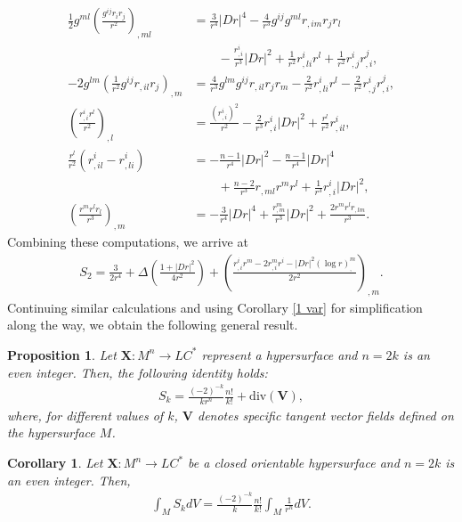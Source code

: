 \documentclass[reqno,11pt, letterpaper]{amsart}
\theoremstyle{plain}
\newtheorem{prop}[thm]{Proposition}
\newtheorem{cor}[thm]{Corollary}
\theoremstyle{definition}
\numberwithin{equation}{section}
\begin{document}
\begin{align*}
	\frac{1}{2} g^{ml} \left( \frac{g^{ij} r_i r_j}{r^2} \right)_{,ml} &= \frac{3}{r^4} |Dr|^4 - \frac{4}{r^3} g^{ij} g^{ml} r_{,im} r_j r_l\\
	&\qquad- \frac{r^i_{,i}}{r^3} |Dr|^2 + \frac{1}{r^2} r^i_{,li} r^l + \frac{1}{r^2} r^i_{,j} r^j_{,i}, \\
	-2 g^{lm} \left( \frac{1}{r^2} g^{ij} r_{,il} r_j \right)_{,m} &= \frac{4}{r^3} g^{lm} g^{ij} r_{,il} r_j r_m - \frac{2}{r^2} r^i_{,li} r^l - \frac{2}{r^2} r^i_{,j} r^j_{,i}, \\
	\left( \frac{r^i_{,i} r^l}{r^2} \right)_{,l} &= \frac{(r^i_{,i})^2}{r^2} - \frac{2}{r^3} r^i_{,i} |Dr|^2 + \frac{r^l}{r^2} r^i_{,il}, \\
	\frac{r^l}{r^2} \left( r^i_{,il} - r^i_{,li} \right) &= -\frac{n-1}{r^4} |Dr|^2 - \frac{n-1}{r^4} |Dr|^4\\
	&\qquad+ \frac{n-2}{r^3} r_{,ml} r^m r^l + \frac{1}{r^3} r^i_{,i} |Dr|^2, \\
	\left( \frac{r^m r^l r_l}{r^3} \right)_{,m} &= -\frac{3}{r^4} |Dr|^4 + \frac{r^m_{,m}}{r^3} |Dr|^2 + \frac{2 r^m r^l r_{,lm}}{r^3}.
\end{align*}
Combining these computations, we arrive at
\begin{align*}
	S_2 = \frac{3}{2 r^4} + \Delta \left( \frac{1 + |Dr|^2}{4 r^2} \right) + \left( \frac{r^i_{,i} r^m - 2 r^m_{,i} r^i - |Dr|^2 (\log r)_{,}^m}{2 r^2} \right)_{,m}.
\end{align*}
Continuing similar calculations and using Corollary \ref{1 var} for simplification along the way, we obtain the following general result.
\begin{prop}
	Let $\mathbf{X}:M^n\rightarrow LC^*$  represent a hypersurface and  $n=2k$ is  an even integer. Then, the following identity holds:
	\begin{align*}
		S_k=\frac{(-2)^{-k}}{kr^n}\frac{n!}{k!}+\mathrm{div}(\mathbf{V}),
	\end{align*}
	where, for different values of $k$, 
	$\mathbf{V}$ denotes specific tangent vector fields defined on the hypersurface $M$.
\end{prop}
\begin{cor}
	Let $\mathbf{X}:M^n\rightarrow LC^*$  be a closed orientable hypersurface and  $n=2k$ is an even integer. Then,
	\begin{align*}
		\int_MS_kdV=\frac{(-2)^{-k}}{k}\frac{n!}{k!}\int_M\frac{1}{r^n}dV.
	\end{align*}
\end{cor}
\end{document}
